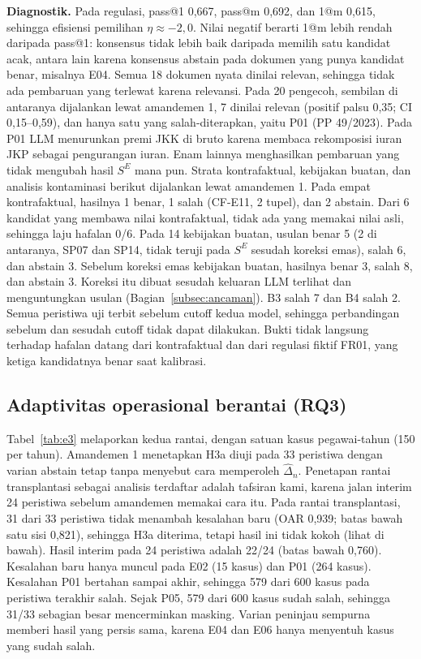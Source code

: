\documentclass[journal,a4paper]{IEEEtran}
\makeatletter
\DeclareRobustCommand{\en}[1]{{\usefont{\f@encoding}{\f@family}{\f@series}{it}#1\/}}
\newcommand{\SE}{S^{E}}
\makeatother
\begin{document}
\textbf{Diagnostik.} Pada regulasi, \en{pass@1} 0,667, \en{pass@m} 0,692, dan \en{1@m} 0,615, sehingga efisiensi pemilihan $\eta \approx -2{,}0$. Nilai negatif berarti \en{1@m} lebih rendah daripada \en{pass@1}: konsensus tidak lebih baik daripada memilih satu kandidat acak, antara lain karena konsensus \en{abstain} pada dokumen yang punya kandidat benar, misalnya E04. Semua 18 dokumen nyata dinilai relevan, sehingga tidak ada pembaruan yang terlewat karena relevansi. Pada 20 pengecoh, sembilan di antaranya dijalankan lewat amandemen 1, 7 dinilai relevan (positif palsu 0,35; CI 0,15--0,59), dan hanya satu yang salah-diterapkan, yaitu P01 (PP 49/2023). Pada P01 LLM menurunkan premi JKK di bruto karena membaca rekomposisi iuran JKP sebagai pengurangan iuran. Enam lainnya menghasilkan pembaruan yang tidak mengubah hasil $\SE$ mana pun. Strata kontrafaktual, kebijakan buatan, dan analisis kontaminasi berikut dijalankan lewat amandemen 1. Pada empat kontrafaktual, hasilnya 1 benar, 1 salah (CF-E11, 2 tupel), dan 2 \en{abstain}. Dari 6 kandidat yang membawa nilai kontrafaktual, tidak ada yang memakai nilai asli, sehingga laju hafalan 0/6. Pada 14 kebijakan buatan, usulan benar 5 (2 di antaranya, SP07 dan SP14, tidak teruji pada $\SE$ sesudah koreksi emas), salah 6, dan \en{abstain} 3. Sebelum koreksi emas kebijakan buatan, hasilnya benar 3, salah 8, dan \en{abstain} 3. Koreksi itu dibuat sesudah keluaran LLM terlihat dan menguntungkan usulan (Bagian~\ref{subsec:ancaman}). B3 salah 7 dan B4 salah 2. Semua peristiwa uji terbit sebelum \en{cutoff} kedua model, sehingga perbandingan sebelum dan sesudah \en{cutoff} tidak dapat dilakukan. Bukti tidak langsung terhadap hafalan datang dari kontrafaktual dan dari regulasi fiktif FR01, yang ketiga kandidatnya benar saat kalibrasi.

\subsection{Adaptivitas operasional berantai (RQ3)}
\label{subsec:hasil-rq3}
Tabel~\ref{tab:e3} melaporkan kedua rantai, dengan satuan kasus pegawai-tahun (150 per tahun). Amandemen 1 menetapkan H3a diuji pada 33 peristiwa dengan varian \en{abstain} tetap tanpa menyebut cara memperoleh $\hat{\Delta}_n$. Penetapan rantai transplantasi sebagai analisis terdaftar adalah tafsiran kami, karena jalan interim 24 peristiwa sebelum amandemen memakai cara itu. Pada rantai transplantasi, 31 dari 33 peristiwa tidak menambah kesalahan baru (OAR 0,939; batas bawah satu sisi 0,821), sehingga H3a diterima, tetapi hasil ini tidak kokoh (lihat di bawah). Hasil interim pada 24 peristiwa adalah 22/24 (batas bawah 0,760). Kesalahan baru hanya muncul pada E02 (15 kasus) dan P01 (264 kasus). Kesalahan P01 bertahan sampai akhir, sehingga 579 dari 600 kasus pada peristiwa terakhir salah. Sejak P05, 579 dari 600 kasus sudah salah, sehingga 31/33 sebagian besar mencerminkan \en{masking}. Varian peninjau sempurna memberi hasil yang persis sama, karena E04 dan E06 hanya menyentuh kasus yang sudah salah.
\end{document}

